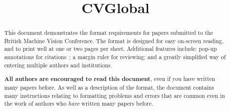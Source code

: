 \documentclass{bmvc2k}
\title{CVGlobal}
\begin{document}
\maketitle

\begin{abstract}
This document demonstrates the format requirements for papers submitted
to the British Machine Vision Conference.  The format is designed for
easy on-screen reading, and to print well at one or two pages per sheet.
Additional features include: pop-up annotations for
citations~\cite{Authors06,Mermin89}; a margin ruler for reviewing; and a
greatly simplified way of entering multiple authors and institutions.

{\bf All authors are encouraged to read this document}, even if you have
written many papers before.  As well as a description of the format, the
document contains many instructions relating to formatting problems and
errors that are common even in the work of authors who {\em have}
written many papers before.
\end{abstract}










\end{document}

